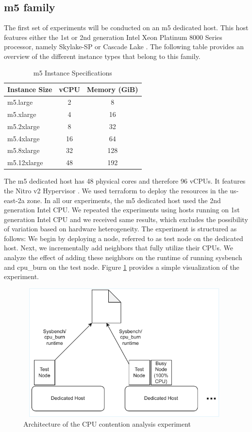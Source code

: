 \subsection{m5 family}
The first set of experiments will be conducted on an m5 dedicated host. This host features either the 1st or 
2nd generation Intel Xeon Platinum 8000 Series processor, namely Skylake-SP or Cascade Lake 
\cite{aws_m5_instances}. The following table provides an overview of the 
different instance types that belong to this family. 
\begin{table}[H]
\centering
\begin{tabular}{lcc}
\hline
\textbf{Instance Size} & \textbf{vCPU} & \textbf{Memory (GiB)} \\
\hline
m5.large     & 2  & 8    \\
m5.xlarge    & 4  & 16   \\
m5.2xlarge   & 8  & 32   \\
m5.4xlarge   & 16 & 64   \\
m5.8xlarge   & 32 & 128  \\
m5.12xlarge  & 48 & 192  \\
\hline
\end{tabular}
\caption{m5 Instance Specifications \cite{aws_m5_instances}}
\end{table}
\noindent
The m5 dedicated host has 48 physical cores and therefore 96 vCPUs. It features the Nitro v2 
Hypervisor \cite{awsEC2GP2025}. We used terraform to deploy the resources in the us-east-2a zone.
In all our experiments, the m5 dedicated host used the 2nd generation Intel CPU. We repeated the experiments
using hosts running on 1st generation Intel CPU and we received same results, which excludes
the possibility of variation based on hardware heterogeneity. 
The experiment is structured as follows: We begin by deploying a node, referred to as test node 
on the dedicated host. Next, we incrementally add neighbors that fully utilize their CPUs. 
We analyze the effect of adding these neighbors on the runtime of running sysbench and cpu\_burn on 
the test node.
Figure \ref{fig:cpu_exp} provides a simple visualization of the experiment. 
\begin{figure}[H]
  \centering
  \includegraphics[width=11cm, height=7cm]{figures/cpu_exp}
  \caption{Architecture of the CPU contention analysis experiment}
  \label{fig:cpu_exp}
\end{figure}
